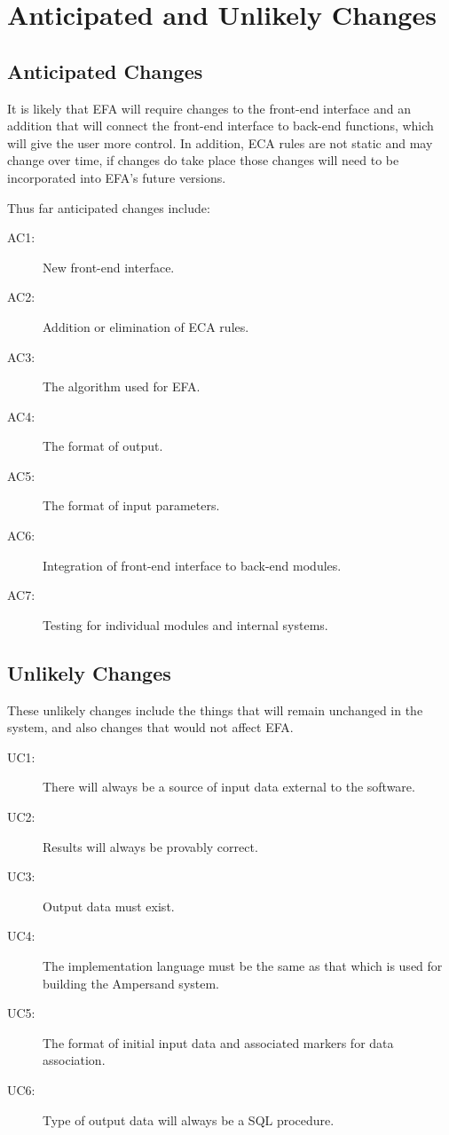 \documentclass[12pt, svgnames]{article}
\begin{document}
\section{Anticipated and Unlikely Changes}
\subsection{Anticipated Changes}
It is likely that EFA will require changes to the front-end interface and an 
addition that will connect the front-end interface to back-end functions, which 
will give the user more control. In addition, ECA rules are not static and may 
change over time, if changes do take place those changes will need to be 
incorporated into EFA's future versions. 

Thus far anticipated changes include:

\begin{description}
    \item[AC1:] New front-end interface.
    \item[AC2:] Addition or elimination of ECA rules.
    \item[AC3:] The algorithm used for EFA.
    \item[AC4:] The format of output.
    \item[AC5:] The format of input parameters.
    \item[AC6:] Integration of front-end interface to back-end modules.
    \item[AC7:] Testing for individual modules and internal systems.
    
\end{description}

\subsection{Unlikely Changes} 

These unlikely changes include the things that will remain unchanged in the 
system, and also changes that would not affect EFA. 

\begin{description}
    \item[UC1:] There will always be a source of input data external to the 
    software.
    \item[UC2:] Results will always be provably correct.
    \item[UC3:] Output data must exist.
    \item[UC4:] The implementation language must be the same as that which is 
    used for building the Ampersand system.
    \item[UC5:] The format of initial input data and associated markers for 
    data association.
    \item[UC6:] Type of output data will always be a SQL procedure.
\end{description}
\end{document}
